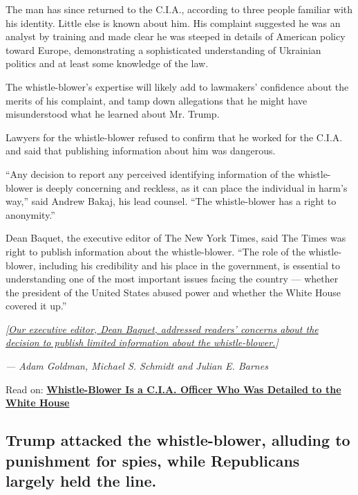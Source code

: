 The man has since returned to the C.I.A., according to three people
familiar with his identity. Little else is known about him. His
complaint suggested he was an analyst by training and made clear he was
steeped in details of American policy toward Europe, demonstrating a
sophisticated understanding of Ukrainian politics and at least some
knowledge of the law.

The whistle-blower's expertise will likely add to lawmakers' confidence
about the merits of his complaint, and tamp down allegations that he
might have misunderstood what he learned about Mr. Trump.

Lawyers for the whistle-blower refused to confirm that he worked for the
C.I.A. and said that publishing information about him was dangerous.

``Any decision to report any perceived identifying information of the
whistle-blower is deeply concerning and reckless, as it can place the
individual in harm's way,'' said Andrew Bakaj, his lead counsel. ``The
whistle-blower has a right to anonymity.''

Dean Baquet, the executive editor of The New York Times, said The Times
was right to publish information about the whistle-blower. ``The role of
the whistle-blower, including his credibility and his place in the
government, is essential to understanding one of the most important
issues facing the country --- whether the president of the United States
abused power and whether the White House covered it up.''

\emph{{[}}\href{https://www.nytimes.com/2019/09/26/reader-center/whistle-blower-identity.html}{\emph{Our
executive editor, Dean Baquet, addressed readers' concerns about the
decision to publish limited information about the
whistle-blower.}}\emph{{]}}

\emph{--- Adam Goldman, Michael S. Schmidt and Julian E. Barnes}

Read on:
\textbf{\href{https://www.nytimes.com/2019/09/26/us/politics/who-is-whistleblower.html}{Whistle-Blower
Is a C.I.A. Officer Who Was Detailed to the White
House}}\href{https://www.nytimes.com/2019/09/26/us/politics/who-is-whistleblower.html}{}

\hypertarget{trump-attacked-the-whistle-blower-alluding-to-punishment-for-spies-while-republicans-largely-held-the-line}{%
\subsection{Trump attacked the whistle-blower, alluding to punishment
for spies, while Republicans largely held the
line.}\label{trump-attacked-the-whistle-blower-alluding-to-punishment-for-spies-while-republicans-largely-held-the-line}}

